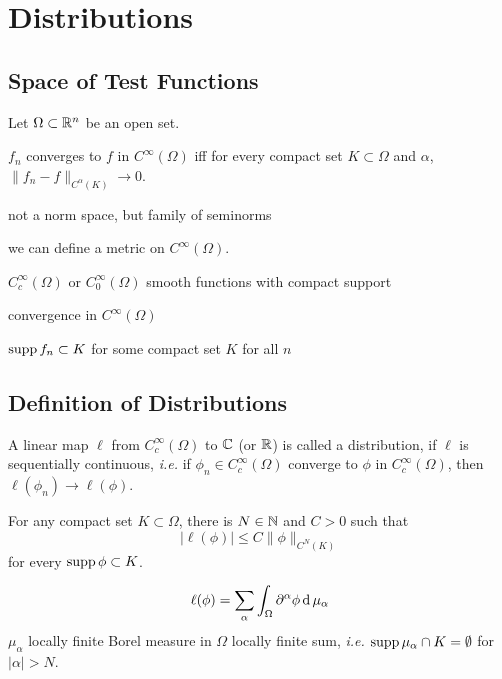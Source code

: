 \chapter{Distributions}


\section{Space of Test Functions}

Let $\Omega\subset\mathbb{R}^n$ be an open set.

\begin{definition}
    $f_n$ converges to $f$ in $C^\infty(\Omega)$ iff for every compact set $K\subset \Omega$ and $\alpha$, $\|f_n-f\|_{C^\alpha(K)}\to 0$.
\end{definition}

not a norm space, but family of seminorms

we can define a metric on $C^\infty(\Omega)$.

$C_c^\infty(\Omega)$ or $C_0^\infty(\Omega)$ smooth functions with compact support

\begin{definition}
    convergence in $C^\infty(\Omega)$

    $\operatorname{supp} f_n\subset K$ for some compact set $K$ for all $n$
\end{definition}


\section{Definition of Distributions}



\begin{definition}
    A linear map $\ell$ from $C_c^\infty(\Omega)$ to $\mathbb{C}$ (or $\mathbb{R}$) is called a distribution, if $\ell$ is sequentially continuous, \emph{i.e.}
if $\phi_n\in C_c^\infty(\Omega)$ converge to $\phi$ in $C_c^\infty(\Omega)$, then $\ell(\phi_n)\to\ell(\phi)$.
\end{definition}

\begin{definition}
    For any compact set $K\subset \Omega$, there is $N\in\mathbb{N}$ and $C>0$ such that 
    \[|\ell(\phi)|\leq C\|\phi\|_{C^N(K)}\]
    for every $\operatorname{supp}\phi\subset K$.
\end{definition}

\begin{definition}
    \begin{equation}
        \ell(\phi)=\sum_{\alpha}\int_{\Omega}\partial^\alpha\phi\operatorname{\mathrm{d}}{\mu_\alpha}
    \end{equation}
    $\mu_\alpha$ locally finite Borel measure in $\Omega$
    locally finite sum, \emph{i.e.} $\operatorname{supp}\mu_\alpha\cap K=\emptyset$ for $|\alpha|>N$.
\end{definition}


